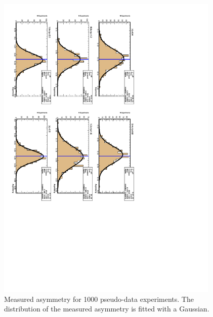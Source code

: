 \begin{figure}[htbp]
  \begin{center}
    \includegraphics*[angle=90,width=0.95\textwidth]{toyasym.pdf}
    \caption{\label{fig:toyasym}Measured asymmetry for 1000 pseudo-data experiments. The distribution of the measured asymmetry is fitted with a Gaussian\cite{baisini2010electron}.}
  \end{center}
\end{figure}


